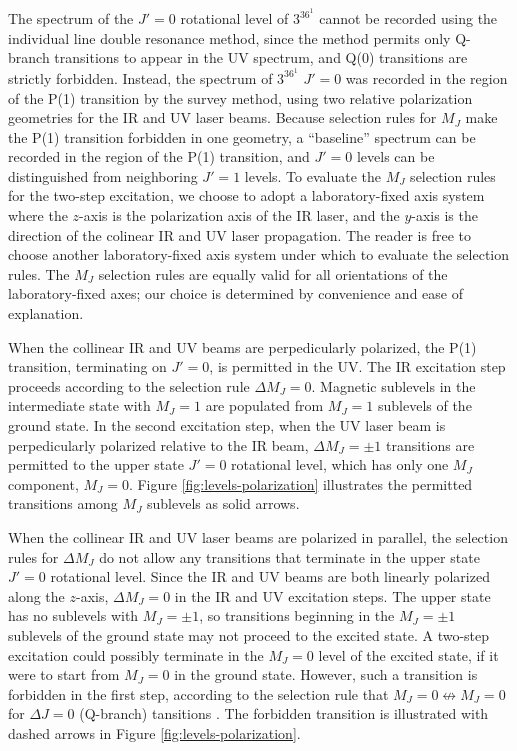 The spectrum of the $J'=0$ rotational level of $3^36^1$  cannot
be recorded using the individual line double resonance method, since
the method permits only Q-branch transitions to appear in the UV
spectrum, and Q(0) transitions are strictly forbidden.  Instead, the
spectrum of $3^36^1$  $J'=0$ was recorded in the region of the
P(1) transition by the survey method, using two relative polarization
geometries for the IR and UV laser beams.  Because selection rules for
$M_J$ make the P(1) transition forbidden in one geometry, a
``baseline'' spectrum can be recorded in the region of the P(1)
transition, and $J'=0$ levels can be distinguished from neighboring
$J'=1$ levels.  To evaluate the $M_J$ selection rules for the two-step
excitation, we choose to adopt a laboratory-fixed axis system where
the $z$-axis is the polarization axis of the IR laser, and the
$y$-axis is the direction of the colinear IR and UV laser propagation.
The reader is free to choose another laboratory-fixed axis system
under which to evaluate the selection rules.  The $M_J$ selection
rules are equally valid for all orientations of the laboratory-fixed
axes; our choice is determined by convenience and ease of explanation.

When the collinear IR and UV beams are perpedicularly polarized, the
P(1) transition, terminating on $J'=0$, is permitted in the UV.  The
IR excitation step proceeds according to the selection rule $\Delta
M_J=0$.  Magnetic sublevels in the intermediate state with $M_J=1$ are
populated from $M_J=1$ sublevels of the ground state.  In the second
excitation step, when the UV laser beam is perpedicularly polarized
relative to the IR beam, $\Delta M_J = \pm 1$ transitions are
permitted to the upper state $J'=0$ rotational level, which has only
one $M_J$ component, $M_J=0$.  Figure \ref{fig:levels-polarization}
illustrates the permitted transitions among $M_J$ sublevels as solid
arrows.

When the collinear IR and UV laser beams are polarized in parallel,
the selection rules for $\Delta M_J$ do not allow any transitions that
terminate in the upper state $J'=0$ rotational level.  Since the IR
and UV beams are both linearly polarized along the $z$-axis, $\Delta
M_J = 0$ in the IR and UV excitation steps.  The upper state has no
sublevels with $M_J=\pm 1$, so transitions beginning in the $M_J=\pm
1$ sublevels of the ground state may not proceed to the excited state.
A two-step excitation could possibly terminate in the $M_J=0$ level of
the excited state, if it were to start from $M_J=0$ in the ground
state.  However, such a transition is forbidden in the first step,
according to the selection rule that $M_J=0 \nleftrightarrow M_J=0$
for $\Delta J = 0$ (Q-branch) tansitions \cite{herzberg66}.  The
forbidden transition is illustrated with dashed arrows in Figure
\ref{fig:levels-polarization}.

